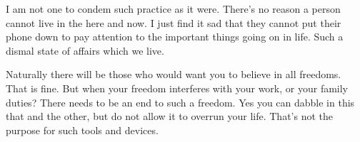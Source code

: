I am not one to condem such practice as it were. There's no reason a person
cannot live in the here and now. I just find it sad that they cannot put their
phone down to pay attention to the important things going on in life. Such a
dismal state of affairs which we live.

Naturally there will be those who would want you to believe in all freedoms.
That is fine. But when your freedom interferes with your work, or your family
duties? There needs to be an end to such a freedom. Yes you can dabble in this
that and the other, but do not allow it to overrun your life. That's not the
purpose for such tools and devices.